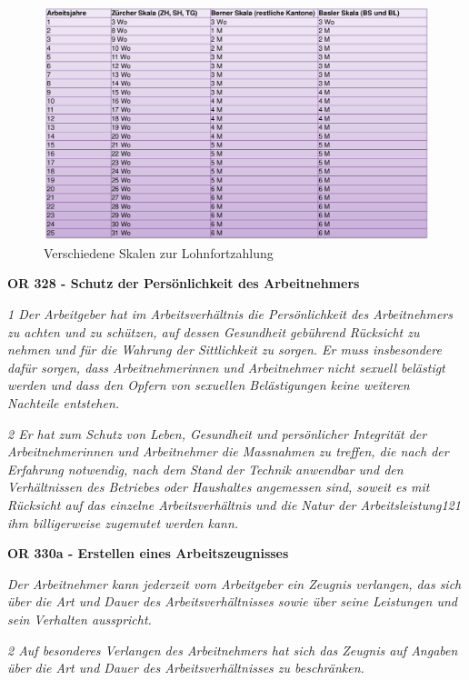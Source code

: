 \begin{figure}
  \centering
  \includegraphics*[width=12cm]{res/arbeitsrecht-lohnfortzahlung-skalen.png}
  \caption{Verschiedene Skalen zur Lohnfortzahlung}
\end{figure}

\noindent
\textbf{OR 328 - Schutz der Persönlichkeit des Arbeitnehmers}

\textit{1 Der Arbeitgeber hat im Arbeitsverhältnis die Persönlichkeit des Arbeitnehmers zu achten und zu schützen, auf dessen Gesundheit gebührend Rücksicht zu nehmen und für die Wahrung der Sittlichkeit zu sorgen. Er muss insbesondere dafür sorgen, dass Arbeitnehmerinnen und Arbeitnehmer nicht sexuell belästigt werden und dass den Opfern von sexuellen Belästigungen keine weiteren Nachteile entstehen.}

\textit{2 Er hat zum Schutz von Leben, Gesundheit und persönlicher Integrität der Arbeitnehmerinnen und Arbeitnehmer die Massnahmen zu treffen, die nach der Erfahrung notwendig, nach dem Stand der Technik anwendbar und den Verhältnissen des Betriebes oder Haushaltes angemessen sind, soweit es mit Rücksicht auf das einzelne Arbeitsverhältnis und die Natur der Arbeitsleistung121 ihm billigerweise zugemutet werden kann.}
\vspace{3mm}

\newpage
\noindent
\textbf{OR 330a - Erstellen eines Arbeitszeugnisses}

\textit{Der Arbeitnehmer kann jederzeit vom Arbeitgeber ein Zeugnis verlangen, das sich über die Art und Dauer des
Arbeitsverhältnisses sowie über seine Leistungen und sein Verhalten ausspricht.}

\textit{2 Auf besonderes Verlangen des Arbeitnehmers hat sich das Zeugnis auf Angaben über die Art und Dauer des Arbeitsverhältnisses zu beschränken.}
\vspace{3mm}

